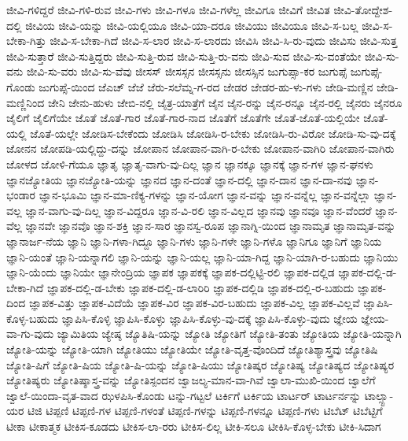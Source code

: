 {ಜೀವಿ-ಗಳಿದ್ದರೆ
ಜೀವಿ-ಗಳಿ-ರುವ
ಜೀವಿ-ಗಳು
ಜೀವಿ-ಗಳೂ
ಜೀವಿ-ಗಳೆಲ್ಲ
ಜೀವಿಗೂ
ಜೀವಿಗೆ
ಜೀವಿತ
ಜೀವಿ-ತೋದ್ದೇಶ-ದಲ್ಲಿ
ಜೀವಿಯ
ಜೀವಿ-ಯನ್ನು
ಜೀವಿ-ಯಲ್ಲಿಯೂ
ಜೀವಿ-ಯಾ-ದರೂ
ಜೀವಿಯು
ಜೀವಿಯೂ
ಜೀವಿ-ಸ-ಬಲ್ಲ
ಜೀವಿ-ಸ-ಬೇಕಾ-ಗಿತ್ತು
ಜೀವಿ-ಸ-ಬೇಕಾ-ಗಿದೆ
ಜೀವಿ-ಸ-ಲಾರ
ಜೀವಿ-ಸ-ಲಾರದು
ಜೀವಿಸಿ
ಜೀವಿ-ಸಿ-ರು-ವುದು
ಜೀವಿಸು
ಜೀವಿ-ಸುತ್ತ
ಜೀವಿ-ಸುತ್ತಾರೆ
ಜೀವಿ-ಸುತ್ತಿದ್ದರು
ಜೀವಿ-ಸುತ್ತಿ-ರುವ
ಜೀವಿ-ಸುತ್ತಿ-ರು-ವನು
ಜೀವಿ-ಸುವ
ಜೀವಿ-ಸು-ವಂತೆಯೇ
ಜೀವಿ-ಸು-ವನು
ಜೀವಿ-ಸು-ವರು
ಜೀವಿ-ಸು-ವೆವು
ಜೀಸಸ್
ಜೀಸಸ್ಸನ
ಜೀಸಸ್ಸನು
ಜೀಸಸ್ಸಿನ
ಜುಗುಪ್ಸಾ-ಕರ
ಜುಗುಪ್ಸೆ
ಜುಗುಪ್ಸೆ-ಗೊಂಡು
ಜುಗುಪ್ಸೆ-ಯಿಂದ
ಜೆಎಚ್
ಜೆಜೆ
ಜೆರು-ಸಲೆಮ್ನ-ಗ-ರದ
ಜೇಡರ
ಜೇಡರ-ಹು-ಳು-ಗಳು
ಜೇಡಿ-ಮಣ್ಣಿನ
ಜೇಡಿ-ಮಣ್ಣಿನಿಂದ
ಜೇನಿ
ಜೇನು-ಹುಳು
ಜೇಬಿ-ನಲ್ಲಿ
ಜೈತ್ರ-ಯಾತ್ರೆಗೆ
ಜೈನ
ಜೈನ-ರನ್ನು
ಜೈನ-ರನ್ನೂ
ಜೈನ-ರಲ್ಲಿ
ಜೈನರು
ಜೈನರೂ
ಜೈಲಿಗೆ
ಜೈಲಿಗೆಯೇ
ಜೊತೆ
ಜೊತೆ-ಗಾರ
ಜೊತೆ-ಗಾರ-ನಾದ
ಜೊತೆಗೆ
ಜೊತೆಗೇ
ಜೊತೆ-ಜೊತೆ-ಯಲ್ಲಿಯೇ
ಜೊತೆ-ಯಲ್ಲಿ
ಜೊತೆ-ಯಲ್ಲೇ
ಜೋಡಿಸ-ಬೇಕೆಂದು
ಜೋಡಿಸಿ
ಜೋಡಿಸಿ-ರ-ಬೇಕು
ಜೋಡಿಸಿ-ರು-ವಿರೋ
ಜೋಡಿ-ಸು-ವು-ದಕ್ಕೆ
ಜೋನನ
ಜೋಪಡಿ-ಯಲ್ಲಿದ್ದು-ದನ್ನು
ಜೋಪಾನ
ಜೋಪಾನ-ವಾಗಿ-ರ-ಬೇಕು
ಜೋಪಾನ-ವಾಗಿರಿ
ಜೋಪಾನ-ವಾಗಿರು
ಜೋಳದ
ಜೋಳಿ-ಗೆಯೂ
ಜ್ಞಾತೃ
ಜ್ಞಾತೃ-ವಾಗು-ವು-ದಿಲ್ಲ
ಜ್ಞಾನ
ಜ್ಞಾನಕ್ಕೂ
ಜ್ಞಾನಕ್ಕೆ
ಜ್ಞಾನ-ಗಳ
ಜ್ಞಾನ-ಘನಳು
ಜ್ಞಾನಜ್ಯೋತಿಯ
ಜ್ಞಾನಜ್ಯೋತಿ-ಯನ್ನು
ಜ್ಞಾನದ
ಜ್ಞಾನ-ದಂತೆ
ಜ್ಞಾನ-ದಲ್ಲಿ
ಜ್ಞಾನ-ದಾನ
ಜ್ಞಾನ-ದಾ-ನವು
ಜ್ಞಾನ-ಭಂಡಾರ
ಜ್ಞಾನ-ಭೂಮಿ
ಜ್ಞಾನ-ಮಾ-ಣಿಕ್ಯ-ಗಳನ್ನು
ಜ್ಞಾನ-ಯೋಗ
ಜ್ಞಾನ-ವನ್ನು
ಜ್ಞಾನ-ವನ್ನೆಲ್ಲ
ಜ್ಞಾನ-ವನ್ನೆಲ್ಲಾ
ಜ್ಞಾನ-ವಲ್ಲ
ಜ್ಞಾನ-ವಾಗು-ವು-ದಿಲ್ಲ
ಜ್ಞಾನ-ವಿದ್ದರೂ
ಜ್ಞಾನ-ವಿ-ರಲಿ
ಜ್ಞಾನ-ವಿಲ್ಲದ
ಜ್ಞಾನವು
ಜ್ಞಾನವೂ
ಜ್ಞಾನ-ವೆಂದರೆ
ಜ್ಞಾನ-ವೆಲ್ಲ
ಜ್ಞಾನವೇ
ಜ್ಞಾನವೊ
ಜ್ಞಾನ-ಶಕ್ತಿ
ಜ್ಞಾನ-ಸಾರ
ಜ್ಞಾನಸ್ವ-ರೂಪ
ಜ್ಞಾನಾಗ್ನಿ-ಯಿಂದ
ಜ್ಞಾನಾಮೃತ
ಜ್ಞಾನಾಮೃತ-ವನ್ನು
ಜ್ಞಾನಾರ್ಜ-ನೆಯ
ಜ್ಞಾನಿ
ಜ್ಞಾನಿ-ಗಳಾ-ಗಿದ್ದೂ
ಜ್ಞಾನಿ-ಗಳು
ಜ್ಞಾನಿ-ಗಳೇ
ಜ್ಞಾನಿ-ಗಳೊ
ಜ್ಞಾನಿಗೂ
ಜ್ಞಾನಿಗೆ
ಜ್ಞಾನಿಯ
ಜ್ಞಾನಿ-ಯಂತೆ
ಜ್ಞಾನಿ-ಯನ್ನಾಗಲಿ
ಜ್ಞಾನಿ-ಯನ್ನು
ಜ್ಞಾನಿ-ಯಲ್ಲ
ಜ್ಞಾನಿ-ಯಾ-ಗಿದ್ದ
ಜ್ಞಾನಿ-ಯಾಗಿ-ರ-ಬಹುದು
ಜ್ಞಾನಿಯು
ಜ್ಞಾನಿ-ಯೆಂದು
ಜ್ಞಾನಿಯೇ
ಜ್ಞಾನೇಂದ್ರಿಯ
ಜ್ಞಾಪಕ
ಜ್ಞಾಪಕಕ್ಕೆ
ಜ್ಞಾಪಕ-ದಲ್ಲಿಟ್ಟಿ-ರಲಿ
ಜ್ಞಾಪಕ-ದಲ್ಲಿಡ
ಜ್ಞಾಪಕ-ದಲ್ಲಿ-ಡ-ಬೇಕಾ-ಗಿದೆ
ಜ್ಞಾಪಕ-ದಲ್ಲಿ-ಡ-ಬೇಕು
ಜ್ಞಾಪಕ-ದಲ್ಲಿ-ಡ-ಲಾರಿರಿ
ಜ್ಞಾಪಕ-ದಲ್ಲಿಡಿ
ಜ್ಞಾಪಕ-ದಲ್ಲಿ-ರ-ಬಹುದು
ಜ್ಞಾಪಕ-ದಿಂದ
ಜ್ಞಾಪಕ-ವಿತ್ತು
ಜ್ಞಾಪಕ-ವಿದೆಯೆ
ಜ್ಞಾಪಕ-ವಿರ
ಜ್ಞಾಪಕ-ವಿರ-ಬಹುದು
ಜ್ಞಾಪಕ-ವಿಲ್ಲ
ಜ್ಞಾಪಕ-ವಿಲ್ಲವೆ
ಜ್ಞಾಪಿಸಿ-ಕೊಳ್ಳ-ಬಹುದು
ಜ್ಞಾಪಿಸಿ-ಕೊಳ್ಳಿ
ಜ್ಞಾಪಿಸಿ-ಕೊಳ್ಳು
ಜ್ಞಾಪಿಸಿ-ಕೊಳ್ಳು-ವು-ದಕ್ಕೆ
ಜ್ಞಾಪಿಸಿ-ಕೊಳ್ಳು-ವುದು
ಜ್ಞೇಯ
ಜ್ಞೇಯ-ವಾ-ಗು-ವುದು
ಜ್ಯಾಮಿತಿಯ
ಜ್ಯೇಷ್ಠ
ಜ್ಯೊತಿಷಿ-ಯನ್ನು
ಜ್ಯೋತಿ
ಜ್ಯೋತಿಗೆ
ಜ್ಯೋತಿ-ತಂತು
ಜ್ಯೋತಿಯ
ಜ್ಯೋತಿ-ಯನ್ನಾಗಿ
ಜ್ಯೋತಿ-ಯನ್ನು
ಜ್ಯೋತಿ-ಯಾಗಿ
ಜ್ಯೋತಿಯು
ಜ್ಯೋತಿಯೇ
ಜ್ಯೋತಿ-ವೃತ್ತ-ವೊಂದಿದೆ
ಜ್ಯೋತಿಶ್ಯಾಸ್ತ್ರವು
ಜ್ಯೋತಿಷಿ
ಜ್ಯೋತಿ-ಷಿಗೆ
ಜ್ಯೋತಿ-ಷಿಯ
ಜ್ಯೋತಿ-ಷಿ-ಯನ್ನು
ಜ್ಯೋತಿ-ಷಿಯು
ಜ್ಯೋತಿಷ್ಕರ
ಜ್ಯೋತಿಷ್ಯ
ಜ್ಯೋತಿಷ್ಯದ
ಜ್ಯೋತಿಷ್ಯರ
ಜ್ಯೋತಿಷ್ಯರು
ಜ್ಯೋತಿಷ್ಶಾಸ್ತ್ರ-ವನ್ನು
ಜ್ಯೋತಿಸ್ಪಂದನ
ಜ್ವಾಜಲ್ಯ-ಮಾನ-ವಾ-ಗಿವೆ
ಜ್ವಾಲಾ-ಮುಖಿ-ಯಿಂದ
ಜ್ವಾಲೆಗೆ
ಜ್ವಾಲೆ-ಯಿಂದಾ-ವೃತ-ವಾದ
ಝಳಪಿಸಿ-ಕೊಂಡು
ಟನ್ನು-ಗಟ್ಟಲೆ
ಟರ್ಕಿಗೆ
ಟರ್ಕಿಯ
ಟಾರ್ಟರ್
ಟಾರ್ಟರ್ನನ್ನು
ಟಾಲ್ಸ್ಟಾ-ಯರ
ಟಿಜಿ
ಟಿಪ್ಪಣಿ
ಟಿಪ್ಪಣಿ-ಗಳ
ಟಿಪ್ಪಣಿ-ಗಳಂತೆ
ಟಿಪ್ಪಣಿ-ಗಳನ್ನು
ಟಿಪ್ಪಣಿ-ಗಳನ್ನೂ
ಟಿಪ್ಪಣಿ-ಗಳು
ಟಿಬೆಟ್
ಟಿಬೆಟ್ಟಿಗೆ
ಟೀಕಾ
ಟೀಕಾತ್ಮಕ
ಟೀಕಿಸ-ಕೂಡದು
ಟೀಕಿಸ-ಲಾ-ರರು
ಟೀಕಿಸ-ಲಿಲ್ಲ
ಟೀಕಿ-ಸಲೂ
ಟೀಕಿಸಿ-ಕೊಳ್ಳ-ಬೇಕು
ಟೀಕಿ-ಸಿದಾಗ
}
